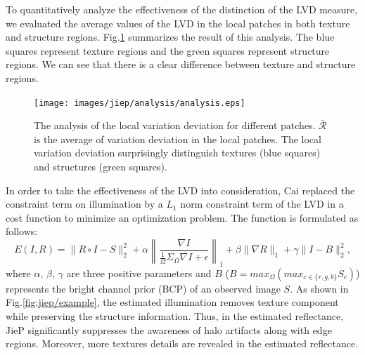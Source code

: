 To quantitatively analyze the effectiveness of the distinction of the LVD measure, we evaluated the average values of the LVD in the local patches in both texture and structure regions. Fig.\ref{fig:jiep/analysis} summarizes the result of this analysis. The blue squares represent texture regions and the green squares represent structure regions. We can see that there is a clear difference between texture and structure regions.
\begin{figure}[tb]
	\centering
	\texttt{[image: images/jiep/analysis/analysis.eps]}
	\caption{The analysis of the local variation deviation for different patches. $\bar{\mathcal{R}}$ is the average of variation deviation in the local patches. The local variation deviation surprisingly distinguish textures (blue squares) and structures (green squares).
	} \label{fig:jiep/analysis}
\end{figure}
In order to take the effectiveness of the LVD into consideration, Cai replaced the constraint term on illumination by a $L_{1}$ norm constraint term of the LVD in a cost function to minimize an optimization problem. The function is formulated as follows:
\begin{equation}
E(I, R) = \|R \circ I - S\|_{2}^{2} + \alpha{\left \|\frac{\nabla{I}}{\frac{1}{\Omega}\Sigma_{\Omega}\nabla{I} + \epsilon} \right\|_{1}} + \beta{\|\nabla{R}\|_{1}} + \gamma{\|I - B\|_{2}^{2}}, \label{eq:jiep}
\end{equation}
where $\alpha$, $\beta$, $\gamma$ are three positive parameters and $B$ ($B = max_{\Omega}(max_{c \in \{r, g, b\}}S_{c})$) represents the bright channel prior (BCP) of an observed image $S$. As shown in Fig.\ref{fig:jiep/example}, the estimated illumination removes texture component while preserving the structure information. Thus, in the estimated reflectance, JieP significantly suppresses the awareness of halo artifacts along with edge regions. Moreover, more textures details are revealed in the estimated reflectance.

